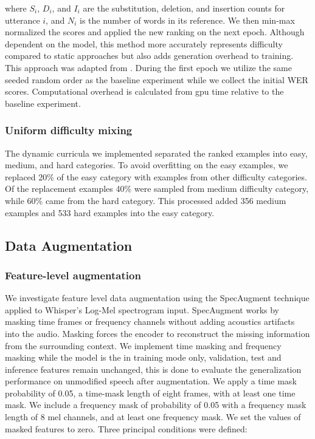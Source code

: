 {where $S_i$, $D_i$, and $I_i$ are the substitution, deletion, and insertion counts for utterance $i$, and $N_i$ is the number of words in its reference. We then min-max normalized the scores and applied the new ranking on the next epoch. Although dependent on the model, this method more accurately represents difficulty compared to static approaches but also adds generation overhead to training. This approach was adapted from \citep{Karakasidis1382}. During the first epoch we utilize the same seeded random order as the baseline experiment while we collect the initial WER scores. Computational overhead is calculated from gpu time relative to the baseline experiment.

\subsubsection{Uniform difficulty mixing}
The dynamic curricula we implemented separated the ranked examples into easy, medium, and hard categories. To avoid overfitting on the easy examples, we replaced 20\% of the easy category with examples from other difficulty categories. Of the replacement examples 40\% were sampled from medium difficulty category, while 60\% came from the hard category. This processed added 356 medium examples and 533 hard examples into the easy category. 

\subsection{Data Augmentation}
\subsubsection{Feature-level augmentation}

We investigate feature level data augmentation using the SpecAugment \citep{Park2019} technique applied to Whisper’s Log-Mel spectrogram input. SpecAugment works by masking time frames or frequency channels without adding acoustics artifacts into the audio. Masking forces the encoder to reconstruct the missing information from the surrounding context. We implement time masking and frequency masking while the model is the in training mode only, validation, test and inference features remain unchanged, this is done to evaluate the generalization performance on unmodified speech after augmentation.
We apply a time mask probability of 0.05, a time-mask length of eight frames, with at least one time mask. We include a frequency mask of probability of 0.05 with a frequency mask length of 8 mel channels, and at least one frequency mask. We set the values of masked features to zero.
Three principal conditions were defined:


}
